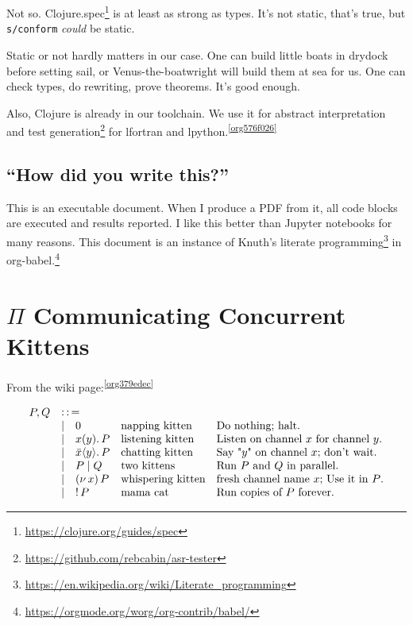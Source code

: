 \documentclass[10pt,oneside,x11names]{article}
\newcommand{\Coloneqq}{\mathrel{\vcenter{\hbox{$:\,:\,=$}}{}}}
\newcommand\napping    [0]{0}
\newcommand\chatting   [3]{\bar{#1}\langle{#2}\rangle{}.\,#3}
\newcommand\listening  [3]{#1(#2).\,#3}
\newcommand\two        [2]{#1\mathrel{\vert}{#2}}
\newcommand\whispering [2]{(\nu\,#1)\,{#2}}
\newcommand\mama       [1]{!\,{#1}}
\theoremstyle{definition}
\theoremstyle{warning}
\begin{document}
Not so. Clojure.spec\footnote{\url{https://clojure.org/guides/spec}} is at
least as strong as types. It's not static, that's true, but
\texttt{s/conform} \emph{could} be static.

Static or not hardly matters in our case. One can build little
boats in drydock before setting sail, or Venus-the-boatwright will
build them at sea for us. One can check types, do rewriting,
prove theorems. It's good enough.

Also, Clojure is already in our toolchain. We use it for abstract
interpretation and test generation\footnote{\url{https://github.com/rebcabin/asr-tester}}
for lfortran and lpython.\textsuperscript{\ref{org576f026}}

\subsection{``How did you write this?''}
\label{sec:org2d4f249}

This is an executable document. When I produce a PDF from it, all
code blocks are executed and results reported. I like this better
than Jupyter notebooks for many reasons. This document
is an instance of Knuth's literate programming\footnote{\url{https://en.wikipedia.org/wiki/Literate\_programming}}
in org-babel.\footnote{\url{https://orgmode.org/worg/org-contrib/babel/}}

\newpage
\section{\(\Pi\) Communicating Concurrent Kittens}
\label{sec:org261ea71}

From the wiki page:\textsuperscript{\ref{org379edec}}

\begin{equation}
\begin{array}{clll}
  P, Q & \Coloneqq \\
       & | \quad \napping            & \textrm{napping kitten}    & \textrm{Do nothing; halt.}                                    \\
       & | \quad \listening{x}{y}{P} & \textrm{listening kitten}  & \textrm{Listen on channel }x\textrm{ for channel }y\textrm{.} \\
       & | \quad \chatting{x}{y}{P}  & \textrm{chatting kitten}   & \textrm{Say "}y\textrm{" on channel }x\textrm{; don't wait.}  \\
       & | \quad \two{P}{Q}          & \textrm{two kittens}       & \textrm{Run }P\textrm{ and }Q\textrm{ in parallel.}           \\
       & | \quad \whispering{x}{P}   & \textrm{whispering kitten} & \textrm{fresh channel name }x\textrm{; Use it in }P\textrm{.} \\
       & | \quad \mama{P}            & \textrm{mama cat}          & \textrm{Run copies of }P\textrm{ forever.} \\
\end{array}
\end{equation}
\end{document}
